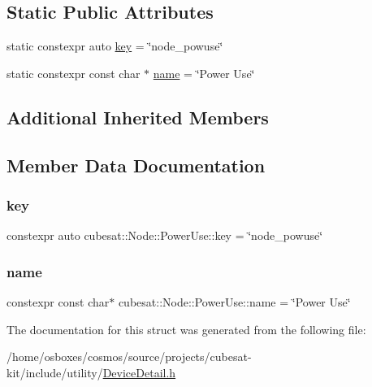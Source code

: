 \subsection*{Static Public Attributes}
\begin{DoxyCompactItemize}
\item 
static constexpr auto \hyperlink{structcubesat_1_1Node_1_1PowerUse_ab7c371f173e9a45244ebf968353f0950}{key} = \char`\"{}node\+\_\+powuse\char`\"{}
\item 
static constexpr const char $\ast$ \hyperlink{structcubesat_1_1Node_1_1PowerUse_a585c9a22ac829b783f35656c4d9a7df6}{name} = \char`\"{}Power Use\char`\"{}
\end{DoxyCompactItemize}
\subsection*{Additional Inherited Members}


\subsection{Member Data Documentation}
\mbox{\label{structcubesat_1_1Node_1_1PowerUse_ab7c371f173e9a45244ebf968353f0950}} 
\subsubsection{\texorpdfstring{key}{key}}
{\footnotesize\ttfamily constexpr auto cubesat\+::\+Node\+::\+Power\+Use\+::key = \char`\"{}node\+\_\+powuse\char`\"{}\hspace{0.3cm}{\ttfamily [static]}}

\mbox{\label{structcubesat_1_1Node_1_1PowerUse_a585c9a22ac829b783f35656c4d9a7df6}} 
\subsubsection{\texorpdfstring{name}{name}}
{\footnotesize\ttfamily constexpr const char$\ast$ cubesat\+::\+Node\+::\+Power\+Use\+::name = \char`\"{}Power Use\char`\"{}\hspace{0.3cm}{\ttfamily [static]}}



The documentation for this struct was generated from the following file\+:\begin{DoxyCompactItemize}
\item 
/home/osboxes/cosmos/source/projects/cubesat-\/kit/include/utility/\hyperlink{DeviceDetail_8h}{Device\+Detail.\+h}\end{DoxyCompactItemize}
